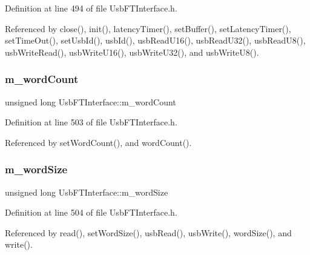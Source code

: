 Definition at line 494 of file Usb\+F\+T\+Interface.\+h.



Referenced by close(), init(), latency\+Timer(), set\+Buffer(), set\+Latency\+Timer(), set\+Time\+Out(), set\+Usb\+Id(), usb\+Id(), usb\+Read\+U16(), usb\+Read\+U32(), usb\+Read\+U8(), usb\+Write\+Read(), usb\+Write\+U16(), usb\+Write\+U32(), and usb\+Write\+U8().

\mbox{\label{classUsbFTInterface_a91c81850db2579afa6a5296e0bf0dbef}} 
\subsubsection{\texorpdfstring{m\+\_\+word\+Count}{m\_wordCount}}
{\footnotesize\ttfamily unsigned long Usb\+F\+T\+Interface\+::m\+\_\+word\+Count\hspace{0.3cm}{\ttfamily [private]}}



Definition at line 503 of file Usb\+F\+T\+Interface.\+h.



Referenced by set\+Word\+Count(), and word\+Count().

\mbox{\label{classUsbFTInterface_a05ccc38a60c4b921b835238b604b38d8}} 
\subsubsection{\texorpdfstring{m\+\_\+word\+Size}{m\_wordSize}}
{\footnotesize\ttfamily unsigned long Usb\+F\+T\+Interface\+::m\+\_\+word\+Size\hspace{0.3cm}{\ttfamily [private]}}



Definition at line 504 of file Usb\+F\+T\+Interface.\+h.



Referenced by read(), set\+Word\+Size(), usb\+Read(), usb\+Write(), word\+Size(), and write().

\mbox{\label{classUsbFTInterface_ad0512841c67ea39da7701e990628059a}} 
